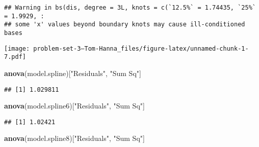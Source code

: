 \documentclass[
]{article}
\newenvironment{Shaded}{\begin{snugshade}}{\end{snugshade}}
\newcommand{\DataTypeTok}[1]{\textcolor[rgb]{0.13,0.29,0.53}{#1}}
\newcommand{\DecValTok}[1]{\textcolor[rgb]{0.00,0.00,0.81}{#1}}
\newcommand{\KeywordTok}[1]{\textcolor[rgb]{0.13,0.29,0.53}{\textbf{#1}}}
\newcommand{\NormalTok}[1]{#1}
\newcommand{\OperatorTok}[1]{\textcolor[rgb]{0.81,0.36,0.00}{\textbf{#1}}}
\newcommand{\StringTok}[1]{\textcolor[rgb]{0.31,0.60,0.02}{#1}}
\begin{document}
\begin{verbatim}
## Warning in bs(dis, degree = 3L, knots = c(`12.5%` = 1.74435, `25%` = 1.9929, :
## some 'x' values beyond boundary knots may cause ill-conditioned bases
\end{verbatim}

\begin{Shaded}
\end{Shaded}

\texttt{[image: problem-set-3---Tom-Hanna\_files/figure-latex/unnamed-chunk-1-7.pdf]}

\begin{Shaded}
\begin{Highlighting}[]
\KeywordTok{anova}\NormalTok{(model.spline)[}\StringTok{"Residuals"}\NormalTok{, }\StringTok{"Sum Sq"}\NormalTok{]}
\end{Highlighting}
\end{Shaded}

\begin{verbatim}
## [1] 1.029811
\end{verbatim}

\begin{Shaded}
\begin{Highlighting}[]
\KeywordTok{anova}\NormalTok{(model.spline6)[}\StringTok{"Residuals"}\NormalTok{, }\StringTok{"Sum Sq"}\NormalTok{]}
\end{Highlighting}
\end{Shaded}

\begin{verbatim}
## [1] 1.02421
\end{verbatim}

\begin{Shaded}
\begin{Highlighting}[]
\KeywordTok{anova}\NormalTok{(model.spline8)[}\StringTok{"Residuals"}\NormalTok{, }\StringTok{"Sum Sq"}\NormalTok{]}
\end{Highlighting}
\end{Shaded}
\end{document}
